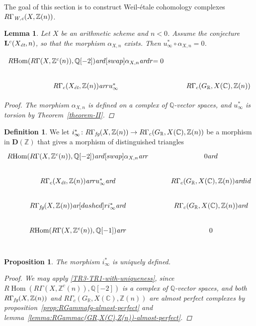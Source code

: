 \documentclass[leqno,12pt]{article}
\theoremstyle{plain}
\newtheorem{lemma}[theorem]{\indent\sc Lemma}
\newtheorem{proposition}[theorem]{\indent\sc Proposition}
\theoremstyle{definition}
\newtheorem{definition}[theorem]{\indent\sc Definition}
\DeclareMathOperator{\Hom}{Hom}
\newcommand{\ZZ}{\mathbb{Z}}
\newcommand{\QQ}{\mathbb{Q}}
\newcommand{\RR}{\mathbb{R}}
\newcommand{\CC}{\mathbb{C}}
\newcommand{\Wc}{\text{\it W,c}}
\newcommand{\et}{\text{\it \'{e}t}}
\newcommand{\fg}{\text{\it fg}}
\newcommand{\ar}{\text{\it ar}}
\newcommand{\RHom}{R\!\Hom}
\begin{document}
The goal of this section is to construct Weil-\'{e}tale cohomology complexes
$R\Gamma_\Wc (X, \ZZ(n))$.

\begin{lemma}
  Let $X$ be an arithmetic scheme and $n < 0$. Assume the conjecture
  $\mathbf{L}^c (X_\et, n)$, so that the morphism $\alpha_{X,n}$ exists.
  Then $u_\infty^* \circ \alpha_{X,n} = 0$.

  \[ \begin{tikzcd}
    \RHom (R\Gamma (X, \ZZ^c (n)), \QQ [-2]) \ar{d}[swap]{\alpha_{X,n}}\ar{dr}{= 0} \\
      R\Gamma_c (X_\et, \ZZ (n)) \ar{r}{u_\infty^*} & R\Gamma_c (G_\RR, X (\CC), \ZZ (n))
    \end{tikzcd} \]

  \begin{proof}
    The morphism $\alpha_{X,n}$ is defined on a complex of $\QQ$-vector spaces,
    and $u_\infty^*$ is torsion by Theorem~\ref{theorem-II}.
  \end{proof}
\end{lemma}

\begin{definition}
  \label{dfn:i-infty}
  We let
  $i_\infty^*\colon R\Gamma_\fg (X, \ZZ (n)) \to R\Gamma_c (G_\RR, X (\CC), \ZZ (n))$
  be a morphism in $\mathbf{D} (\ZZ)$ that gives a morphism of distinguished
  triangles
  \begin{equation}
    \label{eqn:triangle-defining-i-infty}
    \begin{tikzcd}
      \RHom (R\Gamma (X, \ZZ^c (n)), \QQ [-2]) \ar{d}[swap]{\alpha_{X,n}}\ar{r} & 0\ar{d} \\
      R\Gamma_c (X_\et, \ZZ (n)) \ar{r}{u_\infty^*}\ar{d} &  R\Gamma_c (G_\RR, X (\CC), \ZZ (n)) \ar{d}{id} \\
      R\Gamma_\fg (X, \ZZ (n)) \ar[dashed]{r}{i_\infty^*}\ar{d} & R\Gamma_c (G_\RR, X (\CC), \ZZ (n)) \ar{d} \\
      \RHom (R\Gamma (X, \ZZ^c (n)), \QQ [-1])\ar{r} & 0 \\
    \end{tikzcd}
  \end{equation}
\end{definition}

\begin{proposition}
  \label{prop:uniqueness-of-i-infty}
  The morphism $i_\infty^*$ is uniquely defined.

  \begin{proof}
    We may apply \ref{TR3-TR1-with-uniqueness}, since
    $\RHom (R\Gamma (X, \ZZ^c (n)), \QQ [-2])$ is a complex of $\QQ$-vector
    spaces, and both
    $R\Gamma_\fg (X, \ZZ (n))$ and
    $R\Gamma_c (G_\RR, X (\CC), \ZZ (n))$
    are almost perfect complexes by
    proposition~\ref{prop:RGammafg-almost-perfect} and
    lemma~\ref{lemma:RGammac(GR,X(C),Z(n))-almost-perfect}.
  \end{proof}
\end{proposition}
\end{document}
